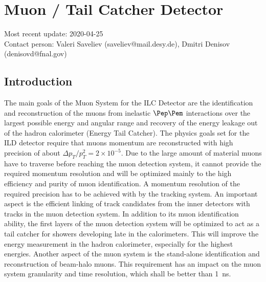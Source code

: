 \section{Muon / Tail Catcher Detector}
Most recent update: 2020-04-25 \\
Contact person: Valeri Saveliev (saveliev@mail.desy.de), Dmitri Denisov (denisovd@fnal.gov)

\subsection{Introduction}
The main goals of the Muon System for the ILC Detector are the identification and reconstruction of the muons from inelastic $\Pep\Pem$ interactions over the largest possible energy and angular range and recovery of the energy leakage out of the hadron calorimeter (Energy Tail Catcher).
The physics goals set for the ILD detector require that muons momentum are reconstructed with high precision of about $\Delta p_T/p^2_T = 2 \times10^{-5}$.
Due to the large amount of material muons have to traverse before reaching the muon detection system, it cannot provide the required momentum resolution and will be optimized mainly to the high efficiency and purity of muon identification.
A momentum resolution of the required precision has to be achieved with by the tracking system. An important aspect is the efficient linking of track candidates from the inner detectors with tracks in the muon detection system.
In addition to its muon identification ability, the first layers of the muon detection system will be optimized to act as a tail catcher for showers developing late in the calorimeters. This will improve the energy measurement in the hadron calorimeter, especially for the highest energies.
Another aspect of the muon system is the stand-alone identification and reconstruction of beam-halo muons. This requirement has an impact on the muon system granularity and time resolution, which shall be better than \SI{1}{ns}.

